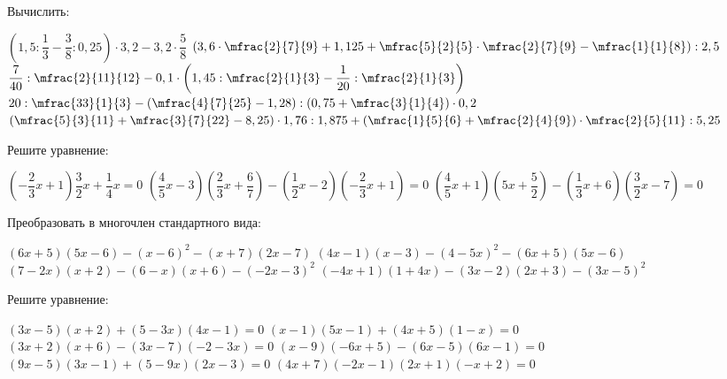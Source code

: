 \begin{class}[number=3]
	\begin{listofex}
		\item Вычислить:
		\begin{itasks}[1]
			\task \( \left(  1,5 : \dfrac{1}{3} - \dfrac{3}{8} : 0,25 \right) \cdot 3,2 - 3,2 \cdot \dfrac{5}{8} \)
			\task \( \left(  3,6 \cdot \mfrac{2}{7}{9} + 1,125 + \mfrac{5}{2}{5} \cdot  \mfrac{2}{7}{9} - \mfrac{1}{1}{8} \right) : 2,5 \)
			\task \( \dfrac{7}{40} : \mfrac{2}{11}{12} - 0,1 \cdot \left( 1,45 : \mfrac{2}{1}{3} - \dfrac{1}{20} : \mfrac{2}{1}{3} \right) \)
			\task \( 20 : \mfrac{33}{1}{3} - \left( \mfrac{4}{7}{25} - 1,28 \right) : \left( 0,75 + \mfrac{3}{1}{4} \right) \cdot 0,2 \)
			\task \( \left( \mfrac{5}{3}{11} + \mfrac{3}{7}{22} - 8,25 \right) \cdot 1,76 : 1,875 + \left( \mfrac{1}{5}{6} + \mfrac{2}{4}{9} \right) \cdot \mfrac{2}{5}{11} : 5,25 \)
		\end{itasks}
		\item Решите уравнение:
			\begin{itasks}[1]
				\task \( (-\dfrac{2}{3}x+1)\dfrac{3}{2}x+\dfrac{1}{4}x=0 \)
				\task \( (\dfrac{4}{5}x-3)(\dfrac{2}{3}x+\dfrac{6}{7})-(\dfrac{1}{2}x-2) (-\dfrac{2}{3}x+1)=0 \)
				\task \( (\dfrac{4}{5}x+1)(5x+\dfrac{5}{2})-(\dfrac{1}{3}x+6) (\dfrac{3}{2}x-7)=0 \)
			\end{itasks}
		\item Преобразовать в многочлен стандартного вида:
		\begin{itasks}[1]
			\task \( (6x+5)(5x-6)-(x-6)^2-(x+7)(2x-7) \)
			\task \( (4x-1)(x-3)-(4-5x)^2-(6x+5)(5x-6) \)
			\task \( (7-2x)(x+2)-(6-x)(x+6)-(-2x-3)^2 \)
			\task \( (-4x+1)(1+4x)-(3x-2)(2x+3)-(3x-5)^2 \)
		\end{itasks}
		\item Решите уравнение:
		\begin{itasks}[1]
			\task \( (3x-5)(x+2)+(5-3x)(4x-1)=0 \)
			\task \( (x-1)(5x-1)+(4x+5)(1-x)=0 \)
			\task \( (3x+2)(x+6)-(3x-7)(-2-3x)=0 \)
			\task \( (x-9)(-6x+5)-(6x-5)(6x-1)=0 \)
			\task \( (9x-5)(3x-1)+(5-9x)(2x-3)=0 \)
			\task \( (4x+7)(-2x-1)(2x+1)(-x+2)=0 \)
		\end{itasks}
	\end{listofex}
\end{class}

